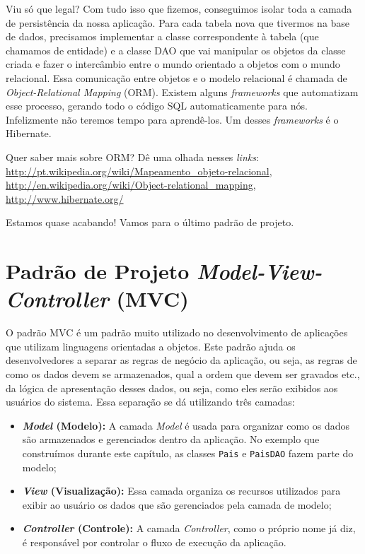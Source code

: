 Viu só que legal? Com tudo isso que fizemos, conseguimos isolar toda a camada de persistência da nossa aplicação. Para cada tabela nova que tivermos na base de dados, precisamos implementar a classe correspondente à tabela (que chamamos de entidade) e a classe DAO que vai manipular os objetos da classe criada e fazer o intercâmbio entre o mundo orientado a objetos com o mundo relacional. Essa comunicação entre objetos e o modelo relacional é chamada de \textit{Object-Relational Mapping} (ORM). Existem alguns \textit{frameworks} que automatizam esse processo, gerando todo o código SQL automaticamente para nós. Infelizmente não teremos tempo para aprendê-los. Um desses \textit{frameworks} é o Hibernate.

\begin{saibaMais}
    Quer saber mais sobre ORM? Dê uma olhada nesses \textit{links}: \url{http://pt.wikipedia.org/wiki/Mapeamento_objeto-relacional}, \url{http://en.wikipedia.org/wiki/Object-relational_mapping}, \url{http://www.hibernate.org/}
\end{saibaMais}

Estamos quase acabando! Vamos para o último padrão de projeto.


\section{Padrão de Projeto \textit{Model-View-Controller} (MVC)}


O padrão MVC é um padrão muito utilizado no desenvolvimento de aplicações que utilizam linguagens orientadas a objetos. Este padrão ajuda os desenvolvedores a separar as regras de negócio da aplicação, ou seja, as regras de como os dados devem se armazenados, qual a ordem que devem ser gravados etc., da lógica de apresentação desses dados, ou seja, como eles serão exibidos aos usuários do sistema. Essa separação se dá utilizando três camadas: 

\begin{itemize}

    \item \textbf{\textit{Model} (Modelo):} A camada \textit{Model} é usada para organizar como os dados são armazenados e gerenciados dentro da aplicação. No exemplo que construímos durante este capítulo, as classes \texttt{Pais} e \texttt{PaisDAO} fazem parte do modelo;
    
    \item \textbf{\textit{View} (Visualização):} Essa camada organiza os recursos utilizados para exibir ao usuário os dados que são gerenciados pela camada de modelo;
    
    \item \textbf{\textit{Controller} (Controle):} A camada \textit{Controller}, como o próprio nome já diz, é responsável por controlar o fluxo de execução da aplicação.
    
\end{itemize}

